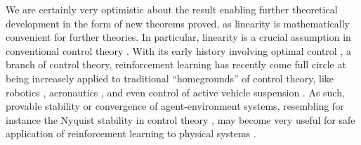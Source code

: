 \documentclass[twoside]{article}
\begin{document}
We are certainly very optimistic about the result enabling further theoretical development in the form of new theorems
proved, as linearity is mathematically convenient for further theories.
In particular, linearity is a crucial assumption in conventional control theory \cite{control-textbook-1,control-textbook-2}. With its early history involving optimal control \cite{Sutton2005ReinforcementLA-mentions-optimal-control}, a branch of control theory, reinforcement learning has recently come full circle at being increasely applied to
traditional ``homegrounds'' of control theory, like robotics \cite{RL-robotics,Li2021ReinforcementLF},
aeronautics \cite{Wang2022DeepRL}, and even control of active vehicle suspension \cite{RL-car-suspension}.
As such, provable stability or convergence of agent-environment systems,
resembling for instance the Nyquist stability in control theory \cite{Valena1980NyquistCF}, may become very useful for safe application of reinforcement learning to physical systems \cite{pmlr-v119-stooke20a,Cheng2019EndtoEndSR}.





\pagebreak

\onecolumn

\setcounter{section}{0}

\end{document}
